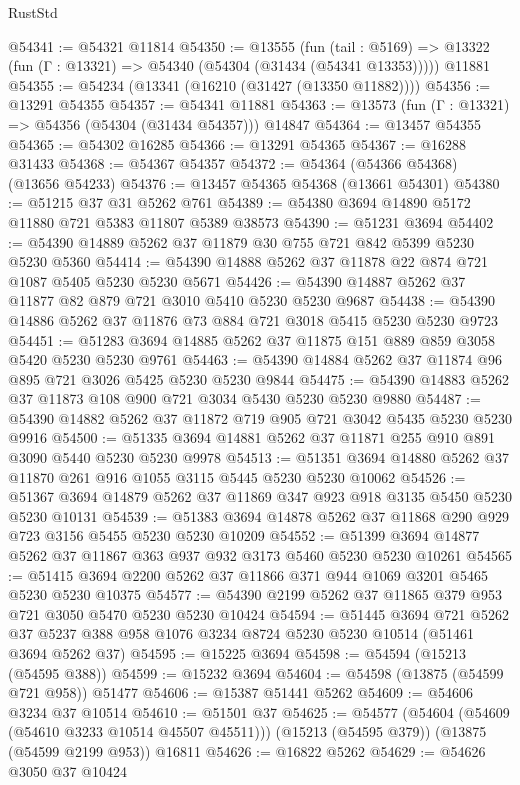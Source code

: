 \begin{lexlean}{RustStd}
\begin{coremodule}
@54341 := @54321 @11814
@54350 := @13555
    (fun (tail : @5169) => @13322 (fun (Γ : @13321) => @54340 (@54304 (@31434 (@54341 @13353)))))
    @11881
@54355 := @54234 (@13341 (@16210 (@31427 (@13350 @11882))))
@54356 := @13291 @54355
@54357 := @54341 @11881
@54363 := @13573 (fun (Γ : @13321) => @54356 (@54304 (@31434 @54357))) @14847
@54364 := @13457 @54355
@54365 := @54302 @16285
@54366 := @13291 @54365
@54367 := @16288 @31433
@54368 := @54367 @54357
@54372 := @54364 (@54366 @54368) (@13656 @54233)
@54376 := @13457 @54365 @54368 (@13661 @54301)
@54380 := @51215 @37 @31 @5262 @761
@54389 := @54380 @3694 @14890 @5172 @11880 @721 @5383 @11807 @5389 @38573
@54390 := @51231 @3694
@54402 := @54390 @14889 @5262 @37 @11879 @30 @755 @721 @842 @5399 @5230 @5230 @5360
@54414 := @54390 @14888 @5262 @37 @11878 @22 @874 @721 @1087 @5405 @5230 @5230 @5671
@54426 := @54390 @14887 @5262 @37 @11877 @82 @879 @721 @3010 @5410 @5230 @5230 @9687
@54438 := @54390 @14886 @5262 @37 @11876 @73 @884 @721 @3018 @5415 @5230 @5230 @9723
@54451 := @51283 @3694 @14885 @5262 @37 @11875 @151 @889 @859 @3058 @5420 @5230 @5230 @9761
@54463 := @54390 @14884 @5262 @37 @11874 @96 @895 @721 @3026 @5425 @5230 @5230 @9844
@54475 := @54390 @14883 @5262 @37 @11873 @108 @900 @721 @3034 @5430 @5230 @5230 @9880
@54487 := @54390 @14882 @5262 @37 @11872 @719 @905 @721 @3042 @5435 @5230 @5230 @9916
@54500 := @51335 @3694 @14881 @5262 @37 @11871 @255 @910 @891 @3090 @5440 @5230 @5230 @9978
@54513 := @51351 @3694 @14880 @5262 @37 @11870 @261 @916 @1055 @3115 @5445 @5230 @5230 @10062
@54526 := @51367 @3694 @14879 @5262 @37 @11869 @347 @923 @918 @3135 @5450 @5230 @5230 @10131
@54539 := @51383 @3694 @14878 @5262 @37 @11868 @290 @929 @723 @3156 @5455 @5230 @5230 @10209
@54552 := @51399 @3694 @14877 @5262 @37 @11867 @363 @937 @932 @3173 @5460 @5230 @5230 @10261
@54565 := @51415 @3694 @2200 @5262 @37 @11866 @371 @944 @1069 @3201 @5465 @5230 @5230 @10375
@54577 := @54390 @2199 @5262 @37 @11865 @379 @953 @721 @3050 @5470 @5230 @5230 @10424
@54594 := @51445
    @3694
    @721
    @5262
    @37
    @5237
    @388
    @958
    @1076
    @3234
    @8724
    @5230
    @5230
    @10514
    (@51461 @3694 @5262 @37)
@54595 := @15225 @3694
@54598 := @54594 (@15213 (@54595 @388))
@54599 := @15232 @3694
@54604 := @54598 (@13875 (@54599 @721 @958)) @51477
@54606 := @15387 @51441 @5262
@54609 := @54606 @3234 @37 @10514
@54610 := @51501 @37
@54625 := @54577
    (@54604 (@54609 (@54610 @3233 @10514 @45507 @45511)))
    (@15213 (@54595 @379))
    (@13875 (@54599 @2199 @953))
    @16811
@54626 := @16822 @5262
@54629 := @54626 @3050 @37 @10424

\end{coremodule}
\end{lexlean}
